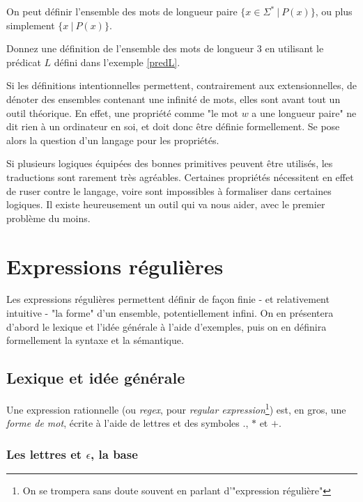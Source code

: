 \begin{example}
On peut définir l'ensemble des mots de longueur paire $\{x \in \Sigma^*~|~P(x)\}$, ou plus simplement $\{x ~|~P(x)\}$.
\end{example}

\begin{exercice}
Donnez une définition de l'ensemble des mots de longueur 3 en utilisant le prédicat $L$ défini dans l'exemple \ref{predL}. 
\end{exercice}

Si les définitions intentionnelles permettent, contrairement aux extensionnelles, de dénoter des ensembles contenant une infinité de mots, elles sont avant tout un outil théorique. En effet, une propriété comme "le mot $w$ a une longueur paire" ne dit rien à un ordinateur en soi, et doit donc être définie formellement. Se pose alors la question d'un langage pour les propriétés.

 Si plusieurs logiques équipées des bonnes primitives peuvent être utilisés, les traductions sont rarement très agréables. Certaines propriétés nécessitent en effet de ruser contre le langage, voire sont impossibles à formaliser dans certaines logiques. Il existe heureusement un outil qui va nous aider, avec le premier problème du moins.

\chapter{Expressions régulières}
\label{regex}
Les expressions régulières permettent définir de façon finie - et relativement intuitive - "la forme" d'un ensemble, potentiellement infini. On en présentera d'abord le lexique et l'idée générale à l'aide d'exemples, puis on en définira formellement la syntaxe et la sémantique.

\section{Lexique et idée générale}

Une expression rationnelle (ou \textit{regex}, pour \textit{regular expression}\footnote{On se trompera sans doute souvent en parlant d'"expression régulière"}) est, en gros, une \textit{forme de mot}, écrite à l'aide de lettres et des symboles $.$, $*$ et $+$.

\subsection{Les lettres et $\epsilon$, la base}

